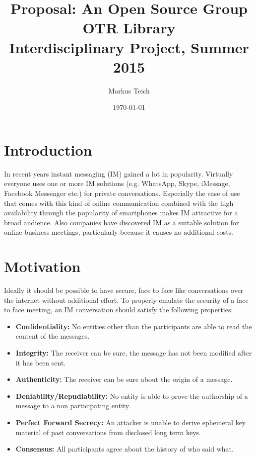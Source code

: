 

\title{Proposal: An Open Source Group OTR Library \\ {\small Interdisciplinary Project, Summer 2015}}
\author{
	Markus Teich
}
\date{\today}



\maketitle


\section{Introduction}

In recent years instant messaging (IM) gained a lot in popularity. Virtually
everyone uses one or more IM solutions (e.g. WhatsApp, Skype, iMessage, Facebook
Messenger etc.) for private conversations. Especially the ease of use that comes
with this kind of online communication combined with the high availability
through the popularity of smartphones makes IM attractive for a broad audience.
Also companies have discovered IM as a suitable solution for online business
meetings, particularly because it causes no additional costs.

\section{Motivation}

Ideally it should be possible to have secure, face to face like conversations
over the internet without additional effort. To properly emulate the security of
a face to face meeting, an IM conversation should satisfy the following
properties:

\begin{itemize}
	\item{\textbf{Confidentiality:} No entities other than the participants are
		able to read the content of the messages.}

	\item{\textbf{Integrity:} The receiver can be sure, the message has not been
		modified after it has been sent.}

	\item{\textbf{Authenticity:} The receiver can be sure about the origin of a
		message.}

	\item{\textbf{Deniability/Repudiability:} No entity is able to prove the
			authorship of a message to a non participating entity.}

	\item{\textbf{Perfect Forward Secrecy:} An attacker is unable to derive
		ephemeral key material of past conversations from disclosed long term
		keys.}

	\item{\textbf{Consensus:} All participants agree about the history of who
		said what.}
\end{itemize}

